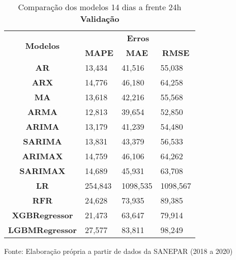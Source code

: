 \begin{table}[H]
	\centering
	\caption{Comparação dos modelos 14 dias a frente 24h \textbf{Validação} }\label{tb:30-24vld}
	\begin{tabular}{@{}clll@{}}
		\toprule
		\multirow{2}{*}{\textbf{Modelos}} & \multicolumn{3}{c}{\textbf{Erros}}                                                                       \\ \cmidrule(l){2-4} 
		& \multicolumn{1}{c}{\textbf{MAPE}} & \multicolumn{1}{c}{\textbf{MAE}} & \multicolumn{1}{c}{\textbf{RMSE}} \\ \hline
\textbf{AR}                       & 13,434                            & 41,516                           & 55,038                            \\
\textbf{ARX}                      & 14,776                            & 46,180                           & 64,258                            \\
\textbf{MA}                       & 13,618                            & 42,216                           & 55,568                            \\
\textbf{ARMA}                     & 12,813                            & 39,654                           & 52,850                            \\
\textbf{ARIMA}                    & 13,179                            & 41,239                           & 54,480                            \\
\textbf{SARIMA}                   & 13,831                            & 43,379                           & 56,533                            \\
\textbf{ARIMAX}                   & 14,759                            & 46,106                           & 64,262                            \\
\textbf{SARIMAX}                  & 14,689                            & 45,931                           & 63,708                            \\
\textbf{LR}        & 254,843                           & 1098,535                         & 1098,567                          \\
\textbf{RFR}  & 24,628                            & 73,935                           & 89,385                            \\
\textbf{XGBRegressor}             & 21,473                            & 63,647                           & 79,914                            \\
\textbf{LGBMRegressor}            & 27,577                            & 83,811                           & 98,249                            \\ \bottomrule
	\end{tabular}

Fonte: Elaboração própria a partir de dados da SANEPAR (2018 a 2020)
\end{table}

